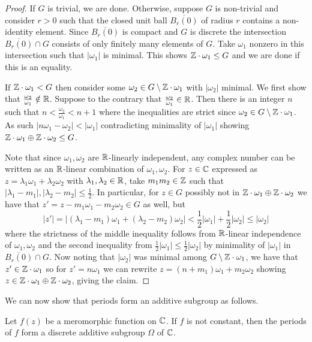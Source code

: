 \begin{proof}
    If $G$ is trivial, we are done. Otherwise, suppose $G$ is non-trivial and consider $r>0$ such that the closed unit ball $\overline{B_{r}(0)}$ of radius $r$ contains a non-identity element. Since $\overline{B_{r}(0)}$ is compact and $G$ is discrete the intersection $\overline{B_{r}(0)}\cap G$ consists of only finitely many elements of $G$. Take $\omega_{1}$ nonzero in this intersection such that $|\omega_{1}|$ is minimal. This shows $\mathbb{Z}\cdot\omega_{1}\leq G$ and we are done if this is an equality. 

    If $\mathbb{Z}\cdot\omega_{1}<G$ then consider some $\omega_{2}\in G\setminus\mathbb{Z}\cdot\omega_{1}$ with $|\omega_{2}|$ minimal. We first show that $\frac{\omega_{2}}{\omega_{1}}\notin\mathbb{R}$. Suppose to the contrary that $\frac{\omega_{2}}{\omega_{1}}\in\mathbb{R}$. Then there is an integer $n$ such that $n<\frac{\omega_{2}}{\omega_{1}}<n+1$  where the inequalities are strict since $\omega_{2}\in G\setminus\mathbb{Z}\cdot\omega_{1}$. As such $|n\omega_{1}-\omega_{2}|<|\omega_{1}|$ contradicting minimality of $|\omega_{1}|$ showing $\mathbb{Z}\cdot\omega_{1}\oplus\mathbb{Z}\cdot\omega_{2}\leq G$.

    Note that since $\omega_{1},\omega_{2}$ are $\mathbb{R}$-linearly independent, any complex number can be written as an $\mathbb{R}$-linear combination of $\omega_{1},\omega_{2}$. For $z\in\mathbb{C}$ expressed as $z=\lambda_{1}\omega_{1}+\lambda_{2}\omega_{2}$ with $\lambda_{1},\lambda_{2}\in\mathbb{R}$, take $m_{1}m_{2}\in\mathbb{Z}$ such that $|\lambda_{1}-m_{1}|,|\lambda_{2}-m_{2}|\leq\frac{1}{2}$. In particular, for $z\in G$ possibly not in $\mathbb{Z}\cdot\omega_{1}\oplus\mathbb{Z}\cdot\omega_{2}$ we have that $z'=z-m_{1}\omega_{1}-m_{2}\omega_{2}\in G$ as well, but 
    $$|z'|=|(\lambda_{1}-m_{1})\omega_{1}+(\lambda_{2}-m_{2})\omega_{2}|<\frac{1}{2}|\omega_{1}|+\frac{1}{2}|\omega_{2}|\leq|\omega_{2}|$$
    where the strictness of the middle inequality follows from $\mathbb{R}$-linear independence of $\omega_{1},\omega_{2}$ and the second inequality from $\frac{1}{2}|\omega_{1}|\leq\frac{1}{2}|\omega_{2}|$ by minimality of $|\omega_{1}|$ in $\overline{B_{r}(0)}\cap G$. Now noting that $|\omega_{2}|$ was minimal among $G\setminus\mathbb{Z}\cdot\omega_{1}$, we have that $z'\in\mathbb{Z}\cdot\omega_{1}$ so for $z'=n\omega_{1}$ we can rewrite $z=(n+m_{1})\omega_{1}+m_{2}\omega_{2}$ showing $z\in\mathbb{Z}\cdot\omega_{1}\oplus\mathbb{Z}\cdot\omega_{2}$, giving the claim. 
\end{proof}
We can now show that periods form an additive subgroup as follows. 
\begin{proposition}\label{prop: periods form an additive subgroup}
    Let $f(z)$ be a meromorphic function on $\mathbb{C}$. If $f$ is not constant, then the periods of $f$ form a discrete additive subgroup $\Omega$ of $\mathbb{C}$. 
\end{proposition}

